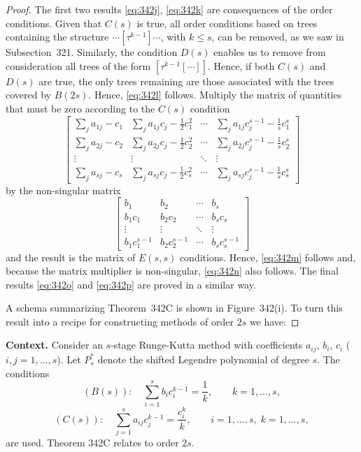 \begin{proof}

The first two results \eqref{eq:342j}, \eqref{eq:342k} are consequences of the order conditions. Given that $C(s)$ is true, all order conditions based on trees containing the structure $\cdots [\tau^{k-1}] \cdots$, with $k \leq s$, can be removed, as we saw in Subsection~321. Similarly, the condition $D(s)$ enables us to remove from consideration all trees of the form $[\tau^{k-1} [\cdots]]$. Hence, if both $C(s)$ and $D(s)$ are true, the only trees remaining are those associated with the trees covered by $B(2s)$. Hence, \eqref{eq:342l} follows. Multiply the matrix of quantities that must be zero according to the $C(s)$ condition
\[
\begin{bmatrix}
\sum_j a_{1j} - c_1 & \sum_j a_{1j} c_j - \frac{1}{2} c_1^2 & \cdots & \sum_j a_{1j} c_j^{s-1} - \frac{1}{s} c_1^s \\
\sum_j a_{2j} - c_2 & \sum_j a_{2j} c_j - \frac{1}{2} c_2^2 & \cdots & \sum_j a_{2j} c_j^{s-1} - \frac{1}{s} c_2^s \\
\vdots & \vdots & \ddots & \vdots \\
\sum_j a_{sj} - c_s & \sum_j a_{sj} c_j - \frac{1}{2} c_s^2 & \cdots & \sum_j a_{sj} c_j^{s-1} - \frac{1}{s} c_s^s
\end{bmatrix}
\]
by the non-singular matrix
\[
\begin{bmatrix}
b_1 & b_2 & \cdots & b_s \\
b_1 c_1 & b_2 c_2 & \cdots & b_s c_s \\
\vdots & \vdots & \ddots & \vdots \\
b_1 c_1^{s-1} & b_2 c_2^{s-1} & \cdots & b_s c_s^{s-1}
\end{bmatrix}
\]
and the result is the matrix of $E(s, s)$ conditions. Hence, \eqref{eq:342m} follows and, because the matrix multiplier is non-singular, \eqref{eq:342n} also follows. The final results \eqref{eq:342o} and \eqref{eq:342p} are proved in a similar way.

A schema summarizing Theorem~342C is shown in Figure~342(i). To turn this result into a recipe for constructing methods of order $2s$ we have:
\end{proof}

\noindent\textbf{Context.}
Consider an $s$-stage Runge-Kutta method with coefficients $a_{ij}$, $b_i$, $c_i$ ($i,j=1,\dots,s$). Let $P_s^*$ denote the shifted Legendre polynomial of degree $s$. The conditions
\[
(B(s)):\quad \sum_{i=1}^s b_i c_i^{k-1}=\frac1k,\qquad k=1,\dots,s,
\]
\[
(C(s)):\quad \sum_{j=1}^s a_{ij} c_j^{k-1}= \frac{c_i^k}{k},\qquad i=1,\dots,s,\; k=1,\dots,s,
\]
are used. Theorem 342C relates to order $2s$.


